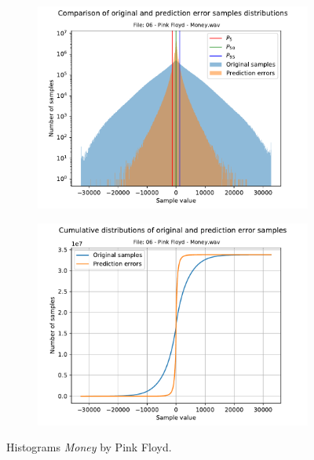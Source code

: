 \begin{figure}[h!]
	\centering
	\begin{subfigure}{0.45\textwidth}
		\centering
		\includegraphics[width=\linewidth]{images/wave_hists/06 - Pink Floyd - Money.wav_hist.pdf}
	\end{subfigure}%
	\begin{subfigure}{0.45\textwidth}
		\centering
		\includegraphics[width=\linewidth]{images/wave_hists/06 - Pink Floyd - Money.wav_hist_cum.pdf}
	\end{subfigure}
	\caption{Histograms \textit{Money} by Pink Floyd.}
	\label{fig:money_pink_floyd}
\end{figure}
